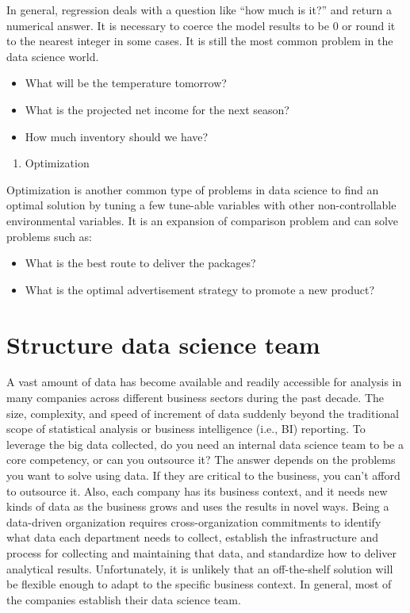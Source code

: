 \documentclass[12pt,]{krantz}
\providecommand{\tightlist}{%
  \setlength{\itemsep}{0pt}\setlength{\parskip}{0pt}}
\begin{document}
In general, regression deals with a question like ``how much is it?'' and return a numerical answer. It is necessary to coerce the model results to be 0 or round it to the nearest integer in some cases. It is still the most common problem in the data science world.

\begin{itemize}
\tightlist
\item
  What will be the temperature tomorrow?
\item
  What is the projected net income for the next season?
\item
  How much inventory should we have?
\end{itemize}

\begin{enumerate}
\def\labelenumi{\arabic{enumi}.}
\setcounter{enumi}{5}
\tightlist
\item
  Optimization
\end{enumerate}

Optimization is another common type of problems in data science to find an optimal solution by tuning a few tune-able variables with other non-controllable environmental variables. It is an expansion of comparison problem and can solve problems such as:

\begin{itemize}
\tightlist
\item
  What is the best route to deliver the packages?
\item
  What is the optimal advertisement strategy to promote a new product?
\end{itemize}

\hypertarget{structure-data-science-team}{%
\section{Structure data science team}\label{structure-data-science-team}}

A vast amount of data has become available and readily accessible for analysis in many companies across different business sectors during the past decade. The size, complexity, and speed of increment of data suddenly beyond the traditional scope of statistical analysis or business intelligence (i.e., BI) reporting. To leverage the big data collected, do you need an internal data science team to be a core competency, or can you outsource it? The answer depends on the problems you want to solve using data. If they are critical to the business, you can't afford to outsource it. Also, each company has its business context, and it needs new kinds of data as the business grows and uses the results in novel ways. Being a data-driven organization requires cross-organization commitments to identify what data each department needs to collect, establish the infrastructure and process for collecting and maintaining that data, and standardize how to deliver analytical results. Unfortunately, it is unlikely that an off-the-shelf solution will be flexible enough to adapt to the specific business context. In general, most of the companies establish their data science team.
\end{document}
